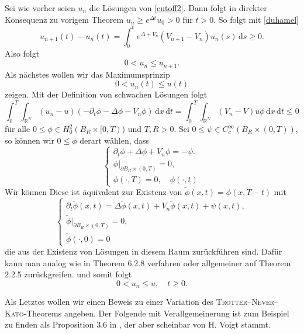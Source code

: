 \documentclass[11pt]{article}
\theoremstyle{break}
\begin{document}
Sei wie vorher seien $u_n$ die Lösungen von \eqref{cutoff2}. Dann folgt in direkter Konsequenz zu vorigem Theorem $u_n\ge e^{\Delta t} u_0> 0$ für $t>0$. So folgt mit \eqref{duhamel} 
\begin{equation}
u_{n+1}(t) -u_n(t)= \int_0^t e^{\Delta + V_n} (V_{n+1}-V_n) u_{n}(s)\, \mathrm ds\ge 0.
\end{equation}
Also folgt
\begin{equation}
0 <u_n \le u_{n+1}.
\end{equation}
Als nächstes wollen wir das Maximumsprinzip 
\begin{equation}
0<u_n(t)\le u(t)
\end{equation}
zeigen.  Mit der Definition von schwachen Lösungen folgt
\begin{equation}
\int_0^T \int_{\mathbb R^N} (u_n-u) (-\partial_t \phi - \Delta \phi - V_n \phi) \, \mathrm dx \, \mathrm dt = \int_0^T \int_{\mathbb R^N} (V_n -V) u\phi \, \mathrm dx \, \mathrm dt \le 0
\end{equation} 
für alle $0\le \phi \in H_0^2(B_R \times [0, T))$ und $T,R>0$.  Sei $0 \le \psi \in C_c^\infty(B_R\times (0,T))$, so können wir $0 \le  \phi$ derart wählen, dass 
\begin{equation}
\begin{cases}
\partial_t \phi + \Delta \phi + V_n \phi = - \psi.\\
\phi\big|_{\partial B_R \times (0,T)} =0,\\
\phi(\cdot ,T)=0, \quad \phi(\cdot, t)
\end{cases}
\end{equation}
Wir können 
Diese ist äquivalent zur Existenz von $\tilde \phi(x,t)=\phi(x,T-t)$ mit
\begin{equation}
\begin{cases}
\partial_t \tilde \phi(x,t) = \Delta \tilde \phi(x,t)+V_n \tilde \phi(x,t)+\psi(x,t),\\
\tilde \phi\big|_{\partial B_R \times (0,T)} =0,\\
\tilde \phi(\cdot,0)=0
\end{cases}
\end{equation}
die aus der Existenz von Lösungen in diesem Raum zurückführen sind. Dafür kann man analog wie in \cite{arendt} Theorem 6.2.8 verfahren oder allgemeiner auf Theorem 2.2.5 zurückgreifen.
und somit folgt 
\begin{equation}
0<u_n \le u, \quad t\ge 0.
\end{equation}

Als Letztes wollen wir einen Beweis zu einer Variation des \textsc{Trotter--Never--Kato}-Theorems angeben.  Der Folgende mit Verallgemeinerung ist zum Beispiel zu finden als Proposition 3.6 in \cite{arendt-goldstein}, der aber scheinbar von H. Voigt stammt.
\end{document}
